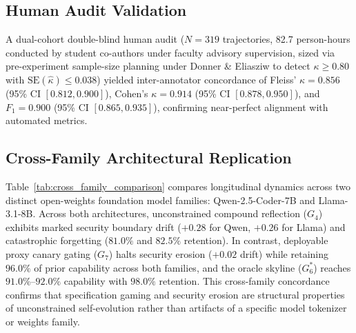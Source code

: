 \documentclass[conference]{IEEEtran}
\begin{document}
\subsection{Human Audit Validation}
A dual-cohort double-blind human audit ($N=319$ trajectories, 82.7 person-hours conducted by student co-authors under faculty advisory supervision, sized via pre-experiment sample-size planning under Donner \& Eliasziw to detect $\kappa \ge 0.80$ with $\text{SE}(\hat{\kappa}) \le 0.038$) yielded inter-annotator concordance of Fleiss' $\kappa = 0.856$ (95\% CI $[0.812, 0.900]$), Cohen's $\kappa = 0.914$ (95\% CI $[0.878, 0.950]$), and $F_1 = 0.900$ (95\% CI $[0.865, 0.935]$), confirming near-perfect alignment with automated metrics.

\subsection{Cross-Family Architectural Replication}
Table~\ref{tab:cross_family_comparison} compares longitudinal dynamics across two distinct open-weights foundation model families: Qwen-2.5-Coder-7B and Llama-3.1-8B. Across both architectures, unconstrained compound reflection ($G_4$) exhibits marked security boundary drift ($+0.28$ for Qwen, $+0.26$ for Llama) and catastrophic forgetting ($81.0\%$ and $82.5\%$ retention). In contrast, deployable proxy canary gating ($G_7$) halts security erosion ($+0.02$ drift) while retaining $96.0\%$ of prior capability across both families, and the oracle skyline ($G_6^*$) reaches $91.0\%\text{--}92.0\%$ capability with $98.0\%$ retention. This cross-family concordance confirms that specification gaming and security erosion are structural properties of unconstrained self-evolution rather than artifacts of a specific model tokenizer or weights family.
\end{document}
